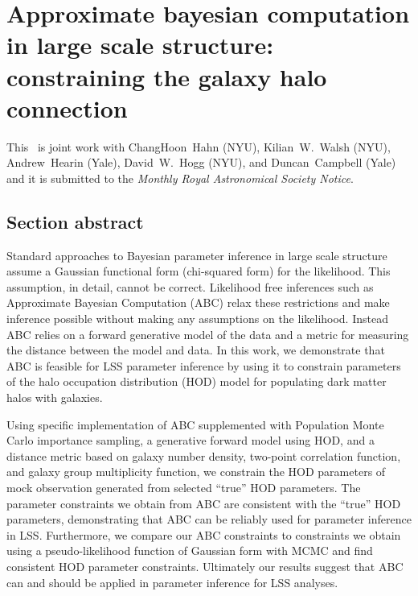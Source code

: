 



\chapter{Approximate bayesian computation in large scale structure: constraining the galaxy halo connection }

This \paper\ is joint work with ChangHoon~Hahn (NYU), Kilian~W.~Walsh (NYU), Andrew~Hearin (Yale), David~W.~Hogg (NYU), and Duncan~Campbell (Yale) and it is submitted to the \emph{Monthly Royal Astronomical Society Notice}. 

\section{Section abstract}

Standard approaches to Bayesian parameter inference in large scale 
structure assume a Gaussian functional form (chi-squared form) 
for the likelihood. This assumption, in detail, cannot %
be correct. Likelihood free inferences such as Approximate Bayesian Computation (ABC) 
relax these restrictions and make inference possible without making any 
assumptions on the likelihood. Instead ABC relies on a forward generative model of the data and a metric 
for measuring the distance between the model and data. In this work, we 
demonstrate that ABC is feasible for LSS parameter inference by using it 
to constrain parameters of the halo occupation distribution (HOD) model 
for populating dark matter halos with galaxies.

Using specific implementation of ABC supplemented with Population Monte Carlo
importance sampling, a generative forward model using HOD, and a distance metric 
based on galaxy number density, two-point correlation function, and galaxy group
multiplicity function, we constrain the HOD parameters of mock observation 
generated from selected ``true'' HOD parameters. The parameter constraints we 
obtain from ABC are consistent with the ``true'' HOD parameters, demonstrating that ABC can be reliably  used for parameter inference in LSS. Furthermore, we compare our ABC constraints to constraints we obtain using a pseudo-likelihood function of Gaussian form with MCMC and find consistent HOD parameter constraints. Ultimately our results suggest that ABC can and should be applied in parameter  inference for LSS analyses. 


